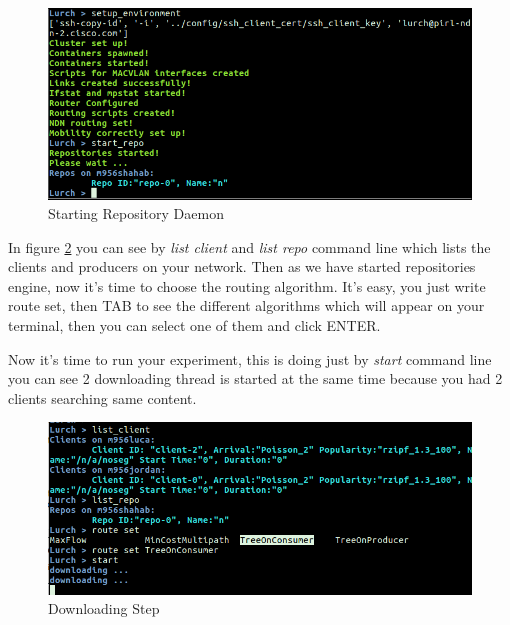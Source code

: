\begin{figure}[H]

\begin{center}

\includegraphics[scale = 0.35]{Pictures/start_repo.png}

\caption{Starting Repository Daemon} \label{repo} 

\end{center}

\end{figure}




In figure \ref{download} you can see by \textit{list client} and \textit{list repo} command line which lists the clients and producers on your network. Then as we have started repositories engine, now it's time to choose the routing algorithm. It's easy, you just write route set, then TAB to see the different algorithms which will appear on your terminal, then you can select one of them and click ENTER.

Now it's time to run your experiment, this is doing just by \textit{start} command line you can see 2 downloading thread is started at the same time because you had 2 clients searching same content.  

\begin{figure}[H]

\begin{center}

\includegraphics[scale = 0.35]{Pictures/download.png}

\caption{Downloading Step} \label{download} 

\end{center}

\end{figure}


